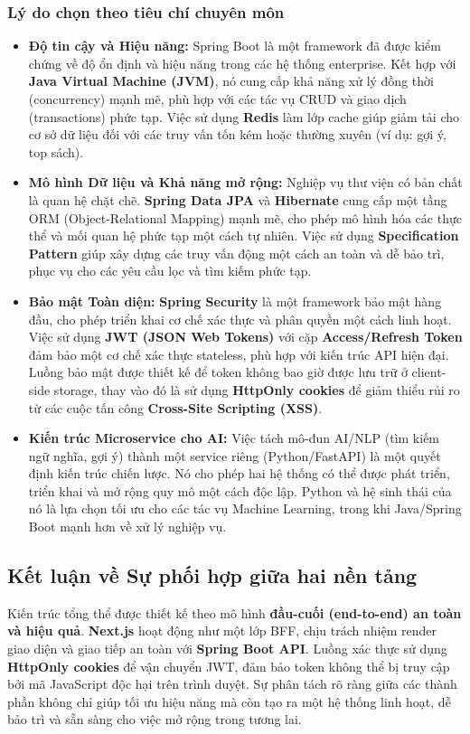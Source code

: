 \subsubsection*{Lý do chọn theo tiêu chí chuyên môn}
\begin{itemize}
 \item \textbf{Độ tin cậy và Hiệu năng:} Spring Boot là một framework đã được kiểm chứng về độ ổn định và hiệu năng trong các hệ thống enterprise. Kết hợp với \textbf{Java Virtual Machine (JVM)}, nó cung cấp khả năng xử lý đồng thời (concurrency) mạnh mẽ, phù hợp với các tác vụ CRUD và giao dịch (transactions) phức tạp. Việc sử dụng \textbf{Redis} làm lớp cache giúp giảm tải cho cơ sở dữ liệu đối với các truy vấn tốn kém hoặc thường xuyên (ví dụ: gợi ý, top sách).

 \item \textbf{Mô hình Dữ liệu và Khả năng mở rộng:} Nghiệp vụ thư viện có bản chất là quan hệ chặt chẽ. \textbf{Spring Data JPA} và \textbf{Hibernate} cung cấp một tầng ORM (Object-Relational Mapping) mạnh mẽ, cho phép mô hình hóa các thực thể và mối quan hệ phức tạp một cách tự nhiên. Việc sử dụng \textbf{Specification Pattern} giúp xây dựng các truy vấn động một cách an toàn và dễ bảo trì, phục vụ cho các yêu cầu lọc và tìm kiếm phức tạp.

 \item \textbf{Bảo mật Toàn diện:} \textbf{Spring Security} là một framework bảo mật hàng đầu, cho phép triển khai cơ chế xác thực và phân quyền một cách linh hoạt. Việc sử dụng \textbf{JWT (JSON Web Tokens)} với cặp \textbf{Access/Refresh Token} đảm bảo một cơ chế xác thực stateless, phù hợp với kiến trúc API hiện đại. Luồng bảo mật được thiết kế để token không bao giờ được lưu trữ ở client-side storage, thay vào đó là sử dụng \textbf{HttpOnly cookies} để giảm thiểu rủi ro từ các cuộc tấn công \textbf{Cross-Site Scripting (XSS)}.

 \item \textbf{Kiến trúc Microservice cho AI:} Việc tách mô-đun AI/NLP (tìm kiếm ngữ nghĩa, gợi ý) thành một service riêng (Python/FastAPI) là một quyết định kiến trúc chiến lược. Nó cho phép hai hệ thống có thể được phát triển, triển khai và mở rộng quy mô một cách độc lập. Python và hệ sinh thái của nó là lựa chọn tối ưu cho các tác vụ Machine Learning, trong khi Java/Spring Boot mạnh hơn về xử lý nghiệp vụ.
\end{itemize}

\subsection*{Kết luận về Sự phối hợp giữa hai nền tảng}
Kiến trúc tổng thể được thiết kế theo mô hình \textbf{đầu-cuối (end-to-end) an toàn và hiệu quả}. \textbf{Next.js} hoạt động như một lớp BFF, chịu trách nhiệm render giao diện và giao tiếp an toàn với \textbf{Spring Boot API}. Luồng xác thực sử dụng \textbf{HttpOnly cookies} để vận chuyển JWT, đảm bảo token không thể bị truy cập bởi mã JavaScript độc hại trên trình duyệt. Sự phân tách rõ ràng giữa các thành phần không chỉ giúp tối ưu hiệu năng mà còn tạo ra một hệ thống linh hoạt, dễ bảo trì và sẵn sàng cho việc mở rộng trong tương lai.



